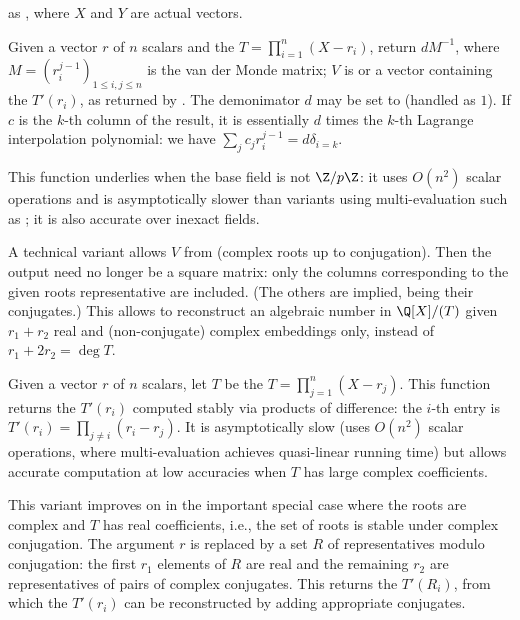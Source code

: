  as ,
where $X$ and $Y$ are actual  vectors.

 Given a vector $r$
of $n$ scalars and the  $T = \prod_{i=1}^n (X - r_i)$,
return $dM^{-1}$, where $M = (r_i^{j-1})_{1\leq i,j\leq n}$ is the van der
Monde matrix;  $V$ is  or a vector containing the $T'(r_i)$, as
returned by . The demonimator $d$ may be set to
 (handled as $1$). If $c$ is the $k$-th column of the result, it is
essentially $d$ times the $k$-th Lagrange interpolation polynomial: we have
$\sum_j c_j r_i^{j-1} = d \delta_{i=k}$.

This function underlies  when the base field is not
$\Z/p\Z$: it uses $O(n^2)$ scalar operations and is asymptotically slower
than variants using multi-evaluation such as ; it is also
accurate over inexact fields.

A technical variant allows $V$ from 
(complex roots up to conjugation). Then the output need no longer be
a square matrix: only the columns corresponding to the given roots
representative are included. (The others are implied, being their conjugates.)
This allows to reconstruct an algebraic number in $\Q[X]/(T)$ given
$r_1 + r_2$ real and (non-conjugate) complex embeddings only, instead
of $r_1 + 2r_2 = \deg T$.

 Given a vector $r$ of $n$ scalars, let
$T$ be the  $T = \prod_{j=1}^n (X - r_j)$. This function returns the
$T'(r_i)$ computed stably via products of difference: the $i$-th entry is
$T'(r_i) = \prod_{j\neq i} (r_i - r_j)$. It is asymptotically slow (uses
$O(n^2)$ scalar operations, where multi-evaluation achieves quasi-linear
running time) but allows accurate computation at low accuracies when $T$ has
large complex coefficients.

This variant improves on  in the important
special case where the roots are complex and $T$ has real coefficients, i.e.,
the set of roots is stable under complex conjugation. The argument $r$ is
replaced by a set $R$ of representatives modulo conjugation: the first $r_1$
elements of $R$ are real and the remaining $r_2$ are representatives of pairs
of complex conjugates. This returns the $T'(R_i)$, from which the $T'(r_i)$
can be reconstructed by adding appropriate conjugates.

